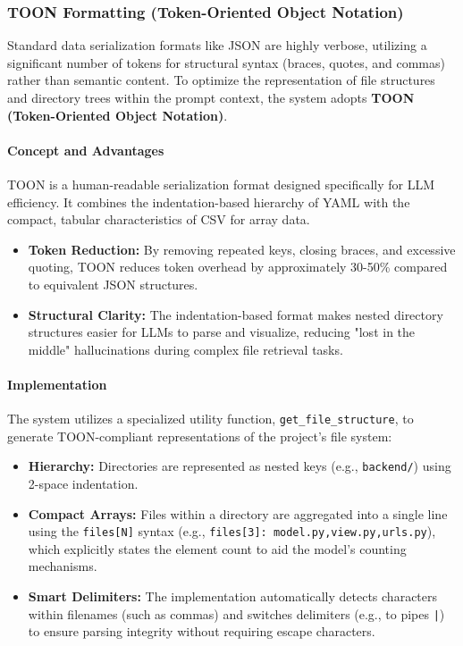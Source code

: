 \documentclass[12pt,a4paper]{article}
\begin{document}
\subsubsection{TOON Formatting (Token-Oriented Object Notation)}

Standard data serialization formats like JSON are highly verbose, utilizing a significant number of tokens for structural syntax (braces, quotes, and commas) rather than semantic content. To optimize the representation of file structures and directory trees within the prompt context, the system adopts \textbf{TOON (Token-Oriented Object Notation)}.

\paragraph{Concept and Advantages}
TOON is a human-readable serialization format designed specifically for LLM efficiency. It combines the indentation-based hierarchy of YAML with the compact, tabular characteristics of CSV for array data.

\begin{itemize}[leftmargin=1.5em]
    \item \textbf{Token Reduction:} By removing repeated keys, closing braces, and excessive quoting, TOON reduces token overhead by approximately 30-50\% compared to equivalent JSON structures.
    \item \textbf{Structural Clarity:} The indentation-based format makes nested directory structures easier for LLMs to parse and visualize, reducing "lost in the middle" hallucinations during complex file retrieval tasks.
\end{itemize}

\paragraph{Implementation}
The system utilizes a specialized utility function, \texttt{get\_file\_structure}, to generate TOON-compliant representations of the project's file system:

\begin{itemize}[leftmargin=1.5em]
    \item \textbf{Hierarchy:} Directories are represented as nested keys (e.g., \texttt{backend/}) using 2-space indentation.
    \item \textbf{Compact Arrays:} Files within a directory are aggregated into a single line using the \texttt{files[N]} syntax (e.g., \texttt{files[3]: model.py,view.py,urls.py}), which explicitly states the element count to aid the model's counting mechanisms.
    \item \textbf{Smart Delimiters:} The implementation automatically detects characters within filenames (such as commas) and switches delimiters (e.g., to pipes \texttt{|}) to ensure parsing integrity without requiring escape characters.
\end{itemize}
\end{document}
